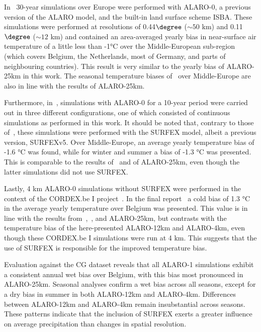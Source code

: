\documentclass[journal abbreviation, manuscript]{copernicus}
\begin{document}
In~\citet{giot_validation_2016} 30-year simulations over Europe were performed with ALARO-0, a previous version of the ALARO model, and the built-in land surface scheme ISBA.
These simulations were performed at resolutions of 0.44$\degree$ ($\sim 50$ km) and 0.11$\degree$  ($\sim 12$ km) and contained an area-averaged yearly bias in near-surface air temperature of a little less than -1°C over the Middle-European sub-region (which covers Belgium, the Netherlands, most of Germany, and parts of neighbouring countries).
This result is very similar to the yearly bias of ALARO-25km in this work.
The seasonal temperature biases of~\citet{giot_validation_2016} over Middle-Europe are also in line with the results of ALARO-25km. 

Furthermore, in~\citet{berckmans_reinitialised_2017}, simulations with ALARO-0 for a 10-year period were carried out in three different configurations, one of which consisted of continuous simulations as performed in this work. 
It should be noted that, contrary to those of~\citet{giot_validation_2016}, these simulations were performed with the SURFEX model, albeit a previous version, SURFEXv5. 
Over Middle-Europe, an average yearly temperature bias of -1.6 °C was found, while for winter and summer a bias of -1.3 °C was presented.
This is comparable to the results of~\citet{giot_validation_2016} and of ALARO-25km, even though the latter simulations did not use SURFEX.

Lastly, 4 km ALARO-0 simulations without SURFEX were performed in the context of the CORDEX.be I project~\citep{termonia_cordexbe_2018}. 
In the final report~\citep{termonia_combining_2018} a cold bias of 1.3 °C in the average yearly temperature over Belgium was presented. 
This value is in line with the results from~\citet{giot_validation_2016},~\citet{berckmans_reinitialised_2017}, and ALARO-25km, 
but contrasts with the temperature bias of the here-presented ALARO-12km and ALARO-4km, even though these CORDEX.be I simulations were run at 4 km. 
This suggests that the use of SURFEX is responsible for the improved temperature bias.

Evaluation against the CG dataset reveals that all ALARO-1 simulations exhibit a consistent annual wet bias over Belgium, with this bias most pronounced in ALARO-25km. 
Seasonal analyses confirm a wet bias across all seasons, except for a dry bias in summer in both ALARO-12km and ALARO-4km. 
Differences between ALARO-12km and ALARO-4km remain insubstantial across seasons.
These patterns indicate that the inclusion of SURFEX exerts a greater influence on average precipitation than changes in spatial resolution.
\end{document}
